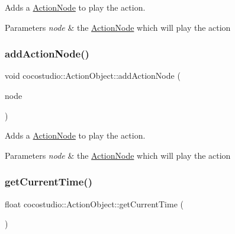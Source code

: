 Adds a \hyperlink{classcocostudio_1_1ActionNode}{Action\+Node} to play the action.


\begin{DoxyParams}{Parameters}
{\em node} & the \hyperlink{classcocostudio_1_1ActionNode}{Action\+Node} which will play the action \\
\hline
\end{DoxyParams}
\mbox{\label{classcocostudio_1_1ActionObject_a8ab2a16c12741039440d78629bda657a}} 
\subsubsection{\texorpdfstring{add\+Action\+Node()}{addActionNode()}\hspace{0.1cm}{\footnotesize\ttfamily [2/2]}}
{\footnotesize\ttfamily void cocostudio\+::\+Action\+Object\+::add\+Action\+Node (\begin{DoxyParamCaption}\item[{\hyperlink{classcocostudio_1_1ActionNode}{Action\+Node} $\ast$}]{node }\end{DoxyParamCaption})}

Adds a \hyperlink{classcocostudio_1_1ActionNode}{Action\+Node} to play the action.


\begin{DoxyParams}{Parameters}
{\em node} & the \hyperlink{classcocostudio_1_1ActionNode}{Action\+Node} which will play the action \\
\hline
\end{DoxyParams}
\mbox{\label{classcocostudio_1_1ActionObject_a3937f4c1b4897d30662266535c1264a0}} 
\subsubsection{\texorpdfstring{get\+Current\+Time()}{getCurrentTime()}\hspace{0.1cm}{\footnotesize\ttfamily [1/2]}}
{\footnotesize\ttfamily float cocostudio\+::\+Action\+Object\+::get\+Current\+Time (\begin{DoxyParamCaption}{ }\end{DoxyParamCaption})}

